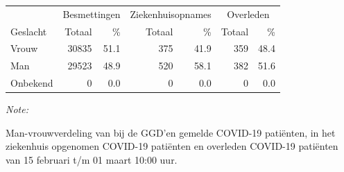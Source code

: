 \documentclass[
  english,
  man,floatsintext]{apa6}
\begin{document}
\begin{table}
\centering\begingroup\fontsize{11}{13}\selectfont

\begin{threeparttable}
\begin{tabular}{lrrrrrr}
\toprule
\multicolumn{1}{c}{ } & \multicolumn{2}{c}{Besmettingen} & \multicolumn{2}{c}{Ziekenhuisopnames} & \multicolumn{2}{c}{Overleden} \\
\cmidrule(l{3pt}r{3pt}){2-3} \cmidrule(l{3pt}r{3pt}){4-5} \cmidrule(l{3pt}r{3pt}){6-7}
Geslacht & Totaal & \% & Totaal & \% & Totaal & \%\\
\midrule
Vrouw & 30835 & 51.1 & 375 & 41.9 & 359 & 48.4\\
Man & 29523 & 48.9 & 520 & 58.1 & 382 & 51.6\\
Onbekend & 0 & 0.0 & 0 & 0.0 & 0 & 0.0\\
\bottomrule
\end{tabular}
\begin{tablenotes}
\item \textit{Note: } 
\item Man-vrouwverdeling van bij de GGD’en gemelde COVID-19 patiënten, in het ziekenhuis opgenomen COVID-19 patiënten en overleden COVID-19 patiënten van 15 februari t/m 01 maart 10:00 uur.
\end{tablenotes}
\end{threeparttable}
\endgroup{}
\end{table}
\newpage
\end{document}
